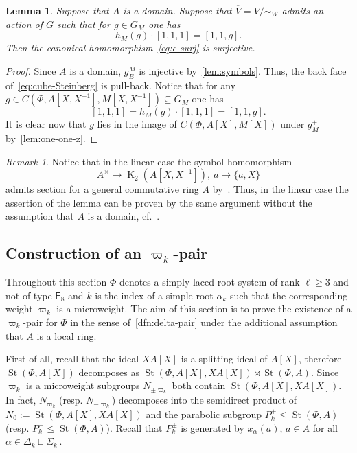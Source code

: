 \documentclass[oneside, 10pt]{amsart}
\DeclareMathOperator{\St}{St}
\DeclareMathOperator{\K}{K}
\newcommand{\rE}{\mathsf{E}}
\newcommand{\inv}{^{-1}}
\numberwithin{equation}{section}
\numberwithin{thm}{section}
\newtheorem{lemma}[thm]{Lemma}
\numberwithin{lemma}{section}
\theoremstyle{definition}
\theoremstyle{remark}
\newtheorem{rem}[lemma]{Remark}
\begin{document}
\begin{lemma} \label{lem:second-reduction}
Suppose that $A$ is a domain.
Suppose that $\overline{V} = V/\sim_W$ admits an action of $G$ such that
for $g \in G_M$ one has \[ h_M(g) \cdot [1, 1, 1] = [1, 1, g]. \]
Then the canonical homomorphism~\eqref{eq:c-surj} is surjective.
\end{lemma}
\begin{proof}
Since $A$ is a domain, $g^M_B$ is injective by~\cref{lem:symbols}.
Thus, the back face of~\eqref{eq:cube-Steinberg} is pull-back.
Notice that for any $g \in C(\Phi, A[X, X\inv], M[X, X\inv]) \subseteq G_M$ one has
\[ [1, 1, 1] = h_M(g) \cdot [1, 1, 1] = [1, 1, g].\]
It is clear now that $g$ lies in the image of $C(\Phi, A[X], M[X])$ under $g^+_M$ by~\cref{lem:one-one-z}.
\end{proof}

\begin{rem}
Notice that in the linear case the symbol homomorphism \[A^\times \to \K_2(A[X, X\inv]),\ a \mapsto \{a, X\}\] admits section
for a general commutative ring $A$ by~\cite{Wa71}.
Thus, in the linear case the assertion of the lemma can be proven by the same argument without the assumption that $A$ is a domain, cf.~\cite[Lemma~3.1g]{Tu83}.
\end{rem}

\subsection{Construction of an \texorpdfstring{$\varpi_k$}{ωₖ}-pair} \label{subsec:construction-sigma}
Throughout this section $\Phi$ denotes a simply laced root system of rank $\ell \geq 3$ and not of type $\rE_8$ and $k$ is the index of
a simple root $\alpha_k$ such that the corresponding weight $\varpi_k$ is a microweight.
The aim of this section is to prove the existence of a $\varpi_k$-pair for $\Phi$ in the sense of~\cref{dfn:delta-pair}
under the additional assumption that $A$ is a local ring.

First of all, recall that the ideal $XA[X]$ is a splitting ideal of $A[X]$, therefore
$\St(\Phi, A[X])$ decomposes as $\St(\Phi, A[X], XA[X]) \rtimes \St(\Phi, A)$.
Since $\varpi_k$ is a microweight subgroups $N_{\pm \varpi_k}$ both contain $\St(\Phi, A[X], XA[X])$.
In fact, $N_{\varpi_k}$ (resp. $N_{-\varpi_k}$) decomposes into the semidirect product of $N_0 := \St(\Phi, A[X], XA[X])$ and the parabolic subgroup $P_k^+ \leq \St(\Phi, A)$ (resp. $P_k^-\leq \St(\Phi, A)$).
Recall that $P_k^\pm$ is generated by $x_\alpha(a)$, $a \in A$ for all $\alpha \in \Delta_k \sqcup \Sigma^\pm_k$.
\end{document}
